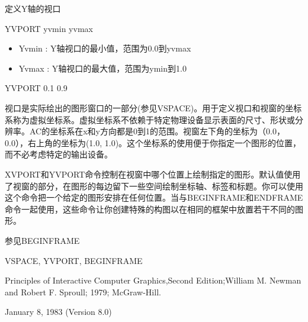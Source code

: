 \label{cmd:yvport}

定义Y轴的视口

YVPORT yvmin yvmax

\begin{itemize}
\item Yvmin : Y轴视口的最小值，范围为0.0到yvmax 
\item Yvmax : Y轴视口的最大值，范围为ymin到1.0 
\end{itemize}

YVPORT 0.1 0.9

视口是实际绘出的图形窗口的一部分(参见VSPACE)。用于定义视口和视窗的坐标系称为虚拟坐标系。虚拟坐标系不依赖于特定物理设备显示表面的尺寸、形状或分辨率。AC的坐标系在x和y方向都是0到1的范围。视窗左下角的坐标为（0.0，0.0），右上角的坐标为(1.0, 1.0)。这个坐标系的使用便于你指定一个图形的位置，而不必考虑特定的输出设备。

XVPORT和YVPORT命令控制在视窗中哪个位置上绘制指定的图形。默认值使用了视窗的部分，在图形的每边留下一些空间绘制坐标轴、标签和标题。你可以使用这个命令把一个给定的图形安排在任何位置。当与BEGINFRAME和ENDFRAME命令一起使用，这些命令让你创建特殊的构图以在相同的框架中放置若干不同的图形。

参见BEGINFRAME

VSPACE, YVPORT, BEGINFRAME

Principles of Interactive Computer Graphics,Second Edition;William M. Newman and Robert F. Sproull; 1979; McGraw-Hill.

January 8, 1983 (Version 8.0)

